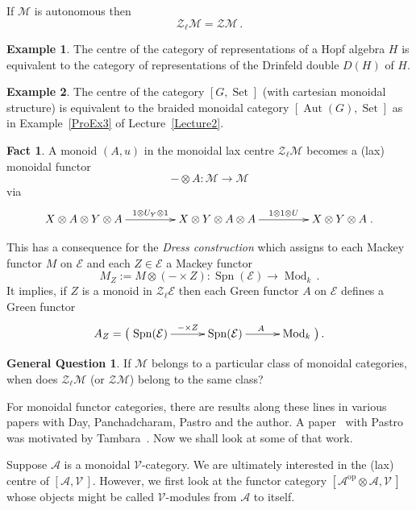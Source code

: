 \documentclass[a4paper,12pt]{article}
\theoremstyle{definition}
\newtheorem{example}{Example}[subsection]
\theoremstyle{fact}
\newtheorem*{Fact}{Fact}%
\theoremstyle{genquest}
\newtheorem*{GenQuest}{General Question}%
\theoremstyle{step}
\newcommand{\catA}{\mathcal{A}}
\newcommand{\Aut}{\operatorname{Aut}}
\newcommand{\catE}{\mathcal{E}}
\newcommand{\funcM}{\mathcal{M}}
\newcommand{\Mod}{\operatorname{Mod}}
\newcommand{\Set}{\operatorname{Set}}
\newcommand{\Spn}{\operatorname{Spn}}
\newcommand{\catV}{\mathcal{V}}
\newcommand{\catZ}{\mathcal{Z}}%
\newcommand{\op}{\operatorname{op}}
\begin{document}
\medskip\noindent
If $\funcM$ is autonomous then
\[
\catZ_\ell \funcM = \catZ\funcM\,.
\]

\begin{example}   
The centre of the category of representations of a Hopf algebra $H$ 
is equivalent to the category of representations of the Drinfeld double $D(H)$ of $H$.
\end{example}   

\begin{example}   
The centre of the category $[G, \Set]$ (with cartesian monoidal structure) 
is equivalent to the braided monoidal category $[\Aut (G), \Set]$ as in Example~\ref{ProEx3} 
of Lecture~\ref{Lecture2}.
\end{example}   

\begin{Fact}   
A monoid $(A,u)$ in the monoidal lax centre $\catZ_\ell \funcM$ becomes a (lax) monoidal functor
\[
- \otimes A : \funcM \to \funcM
\]
via
\[ \xymatrix @C+7mm {
X \otimes A \otimes Y \otimes A \ar[r]^-{1\otimes U_Y \otimes 1}
& X \otimes Y \otimes A \otimes A \ar[r] ^-{1\otimes 1 \otimes U}
& X \otimes Y \otimes A \;.
}\]
\end{Fact}

This has a consequence for the \emph{Dress construction} 
which assigns to each Mackey functor $M$ on $\catE$ and each $Z \in \catE$ a Mackey functor
\[
M_Z := M \otimes (- \times Z) : \Spn  (\catE) \to \Mod_k\,.
\]
It implies, if $Z$ is a monoid in $\catZ_\ell \catE$ then each Green functor $A$ on $\catE$ defines a Green functor
\[ 
A_Z = \bigl( \xymatrix @C+2mm {
 \Spn(\catE) \ar[r]^-{-\times Z} & \Spn (\catE)\ar[r]^{A} & \Mod_k} \bigr)\,.
\]

\begin{GenQuest}   
If $\funcM$ belongs to a particular class of monoidal categories, when does $\catZ_\ell \funcM$ (or $\catZ\funcM$) belong to the same class?
\end{GenQuest}   

For monoidal functor categories, there are results along these lines in various papers with Day, Panchadcharam, Pastro and the author. A paper~\cite{PastroSt2008} with Pastro was motivated by Tambara~\cite{Tambara2006}. 
Now we shall look at some of that work.
 
Suppose $\catA$ is a monoidal $\catV$-category. 
We are ultimately interested in the (lax) centre of $[\catA,\catV\,]$. 
However, we first look at the functor category $[\catA^{\op}  \otimes \catA , \catV\,]$ 
whose objects might be called $\catV$-modules from $\catA$ to itself.
\end{document}
